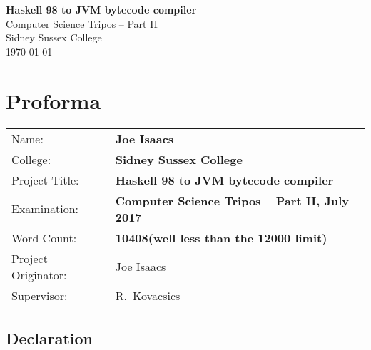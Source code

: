 \documentclass[12pt,a4paper,twoside,openright]{book}
\numberwithin{subcase}{case}
\begin{document}

\thispagestyle{empty}

\pagestyle{empty}
\begingroup


\vspace*{60mm}
\begin{center}
\Huge
\textbf{Haskell 98 to JVM bytecode compiler} \\[5mm]
Computer Science Tripos -- Part II \\[5mm]
Sidney Sussex College \\[5mm]
\today  %
\end{center}


\newpage

\thispagestyle{empty}


\pagestyle{plain}

\frontmatter

\chapter*{Proforma}

{\large
\begin{tabular}{ll}
Name:               & \bf Joe Isaacs                            \\
College:            & \bf Sidney Sussex College                 \\
Project Title:      & \bf Haskell 98 to JVM bytecode compiler   \\
Examination:        & \bf Computer Science Tripos -- Part II, July 2017  \\
Word Count:         & \bf 10408\footnotemark[1]
                    (well less than the 12000 limit)  \\
Project Originator: & Joe Isaacs                      \\
Supervisor:         & R.~Kovacsics                    \\ 
\end{tabular}
}


\section*{Declaration}
\end{document}
